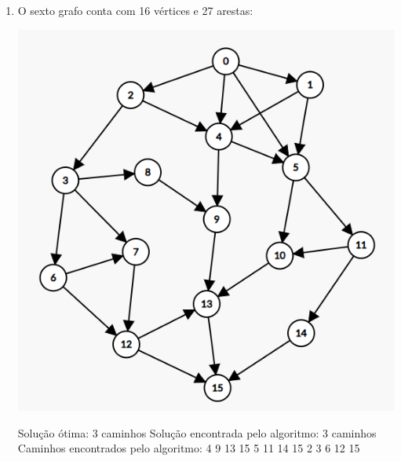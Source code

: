 \begin{enumerate}
    \item O sexto grafo conta com 16 vértices e 27 arestas:
    \begin{center} 
        \includegraphics[scale=0.5]{figuras/Grafo6.png}
    \end{center}
    Solução ótima: 3 caminhos\newline
    Solução encontrada pelo algoritmo: 3 caminhos\newline
    Caminhos encontrados pelo algoritmo: 4 9 13 15  5 11 14 15  2 3 6 12 15 \newline


\end{enumerate}
